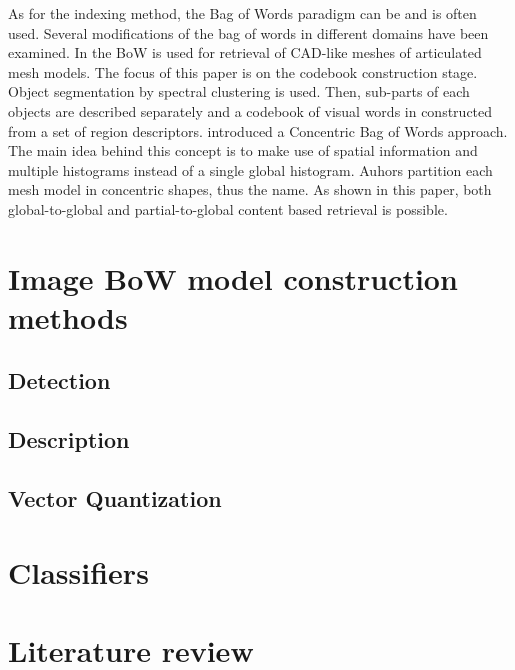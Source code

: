 \documentclass[a4paper,10pt]{article}
\begin{document}
    As for the indexing method, the Bag of Words paradigm can be and is often used. Several modifications of the bag of words in different domains have been examined. In \cite{toldo2009bag} the BoW is used for retrieval of CAD-like meshes of articulated mesh models. The focus of this paper is on the codebook construction stage. Object segmentation by spectral clustering is used. Then, sub-parts of each objects are described separately and a codebook of visual words in constructed from a set of region descriptors. \cite{li2010investigating} introduced a Concentric Bag of Words approach. The main idea behind this concept is to make use of spatial information and multiple histograms instead of a single global histogram. Auhors partition each mesh model in concentric shapes, thus the name. As shown in this paper, both global-to-global and partial-to-global content based retrieval is possible.

\section{Image BoW model construction methods}

\subsection{Detection}
\subsection{Description}
\subsection{Vector Quantization}

\section{Classifiers}

\section{Literature review}


\end{document}
